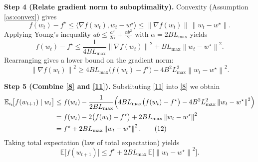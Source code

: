 \documentclass{article}
\newcommand{\E}{\mathbb{E}}
\newcommand{\norm}[1]{\left\lVert #1\right\rVert}
\newcommand{\ip}[2]{\langle #1 , #2\rangle}
\begin{document}
\noindent\textbf{Step 4 (Relate gradient norm to suboptimality).}  
Convexity (Assumption \ref{as:convex}) gives
\[
f(w_{t})-f^{\star}\le \ip{\nabla f(w_{t})}{w_{t}-w^{\star}}
\le \norm{\nabla f(w_{t})}\,\norm{w_{t}-w^{\star}} .
\tag{9}
\]
Applying Young’s inequality $ab\le \frac{a^{2}}{2\alpha}+\frac{\alpha b^{2}}{2}$ with
$\alpha = 2B L_{\max}$ yields
\[
f(w_{t})-f^{\star}
\le \frac{1}{4B L_{\max}}\norm{\nabla f(w_{t})}^{2}
      +B L_{\max}\norm{w_{t}-w^{\star}}^{2}.
\tag{10}
\]
Rearranging gives a lower bound on the gradient norm:
\[
\norm{\nabla f(w_{t})}^{2}
\ge 4B L_{\max}\bigl(f(w_{t})-f^{\star}\bigr)
    -4B^{2}L_{\max}^{2}\norm{w_{t}-w^{\star}}^{2}.
\tag{11}
\]

\noindent\textbf{Step 5 (Combine \eqref{8} and \eqref{11}).}  
Substituting \eqref{11} into \eqref{8} we obtain
\begin{align}
\E_{i_{t}}\!\bigl[f(w_{t+1})\mid w_{t}\bigr]
&\le f(w_{t})-\frac{1}{2B L_{\max}}
\Bigl(4B L_{\max}\bigl(f(w_{t})-f^{\star}\bigr)
      -4B^{2}L_{\max}^{2}\norm{w_{t}-w^{\star}}^{2}\Bigr) \nonumber\\
&= f(w_{t})-2\bigl(f(w_{t})-f^{\star}\bigr)
   +2B L_{\max}\norm{w_{t}-w^{\star}}^{2} \nonumber\\
&= f^{\star}+2B L_{\max}\norm{w_{t}-w^{\star}}^{2}.
\tag{12}
\end{align}
Taking total expectation (law of total expectation) yields
\[
\E\!\bigl[f(w_{t+1})\bigr]
\le f^{\star}+2B L_{\max}\,\E\!\bigl[\norm{w_{t}-w^{\star}}^{2}\bigr].
\tag{13}
\]
\end{document}
